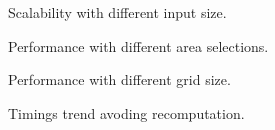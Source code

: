\documentclass{sig-alternate-05-2015}
\begin{document}
\begin{figure}[t]
  \caption{Scalability with different input size.}
  \label{scalability}
\end{figure}
\begin{figure}[t]
  \caption{Performance with different area selections.}
  \label{square}
\end{figure}
\begin{figure}[t]
  \caption{Performance with different grid size.}
  \label{step}
\end{figure}
\begin{figure}[t]
  \caption{Timings trend avoding recomputation.}
  \label{recomputation}
\end{figure}
\end{document}
